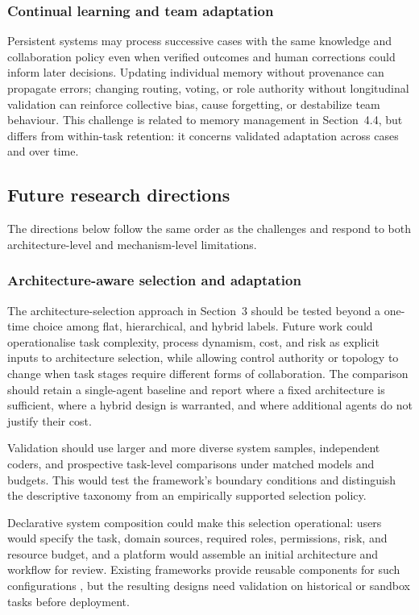 \documentclass[a4paper,fleqn]{cas-dc}
\begin{document}
\subsubsection{Continual learning and team adaptation}
\label{sec:learning_challenges}

Persistent systems may process successive cases with the same knowledge and
collaboration policy even when verified outcomes and human corrections could
inform later decisions. Updating individual memory without provenance can
propagate errors; changing routing, voting, or role authority without
longitudinal validation can reinforce collective bias, cause forgetting, or
destabilize team behaviour. This challenge is related to memory management in
Section~4.4, but differs from within-task retention: it concerns validated
adaptation across cases and over time.

\subsection{Future research directions}
\label{sec:future_directions}

The directions below follow the same order as the challenges and respond to
both architecture-level and mechanism-level limitations.

\subsubsection{Architecture-aware selection and adaptation}

The architecture-selection approach in Section~3 should be tested beyond a
one-time choice among flat, hierarchical, and hybrid labels. Future work could
operationalise task complexity, process dynamism, cost, and risk as explicit
inputs to architecture selection, while allowing control authority or topology
to change when task stages require different forms of collaboration. The
comparison should retain a single-agent baseline and report where a fixed
architecture is sufficient, where a hybrid design is warranted, and where
additional agents do not justify their cost.

Validation should use larger and more diverse system samples, independent
coders, and prospective task-level comparisons under matched models and
budgets. This would test the framework's boundary conditions and distinguish
the descriptive taxonomy from an empirically supported selection policy.

Declarative system composition could make this selection operational: users
would specify the task, domain sources, required roles, permissions, risk, and
resource budget, and a platform would assemble an initial architecture and
workflow for review. Existing frameworks provide reusable components for
such configurations \citep{wu2024autogen,langgraph2024,crewai2023,dify2024},
but the resulting designs need validation on historical or sandbox tasks
before deployment.
\end{document}

